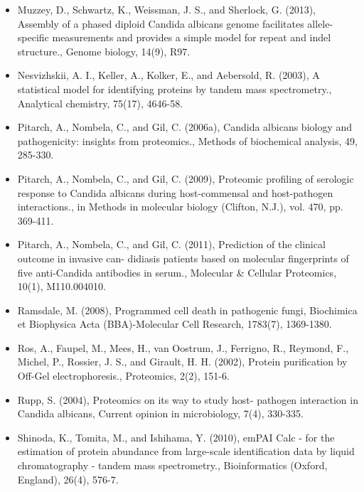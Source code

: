 \begin{itemize}
\item[]{%
Muzzey, D., Schwartz, K., Weissman, J. S., and Sherlock, G. (2013), Assembly of a phased
diploid Candida albicans genome facilitates allele-specific measurements and provides a
simple model for repeat and indel structure., Genome biology, 14(9), R97.
}

\item[]{%
Nesvizhskii, A. I., Keller, A., Kolker, E., and Aebersold, R. (2003), A statistical model for 
identifying proteins by tandem mass spectrometry., Analytical chemistry, 75(17), 4646-58.
}

\item[]{%
Pitarch, A., Nombela, C., and Gil, C. (2006a), Candida albicans biology and pathogenicity:
insights from proteomics., 
Methods of biochemical analysis, 49, 285-330.
}

\item[]{%
Pitarch, A., Nombela, C., and Gil, C. (2009), Proteomic profiling of serologic response to 
Candida albicans during host-commensal and host-pathogen interactions., 
in Methods in molecular biology (Clifton, N.J.), vol. 470, pp. 369-411.
}

\item[]{%
Pitarch, A., Nombela, C., and Gil, C. (2011), Prediction of the clinical outcome in invasive can-
didiasis patients based on molecular fingerprints of five anti-Candida antibodies in serum.,
Molecular \& Cellular Proteomics, 10(1), M110.004010.
}

\item[]{%
Ramsdale, M. (2008), Programmed cell death in pathogenic fungi, Biochimica et Biophysica
Acta (BBA)-Molecular Cell Research, 1783(7), 1369-1380.
}


\item[]{%
Ros, A., Faupel, M., Mees, H., van Oostrum, J., Ferrigno, R., Reymond, F., Michel, P., Rossier,
J. S., and Girault, H. H. (2002), Protein purification by Off-Gel electrophoresis., Proteomics,
2(2), 151-6.
}

\item[]{%
Rupp, S. (2004), Proteomics on its way to study host- pathogen interaction in Candida albicans,
 Current opinion in microbiology, 7(4), 330-335.
}

\item[]{%
Shinoda, K., Tomita, M., and Ishihama, Y. (2010), 
emPAI Calc - for the estimation of protein abundance from large-scale
identification data by liquid chromatography - tandem mass spectrometry.,
Bioinformatics (Oxford, England), 26(4), 576-7.
}


\end{itemize}
